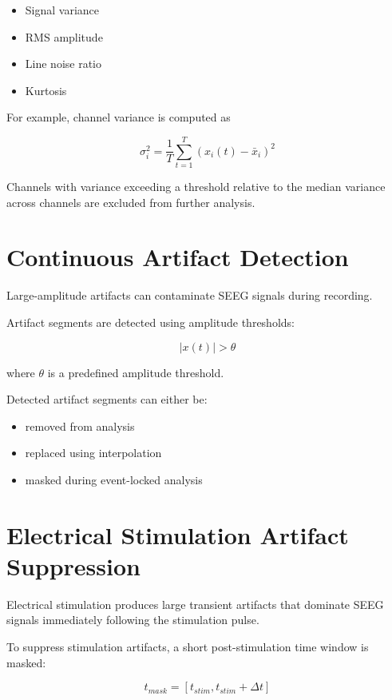 \documentclass[11pt]{report}
\begin{document}
\begin{itemize}
\item Signal variance
\item RMS amplitude
\item Line noise ratio
\item Kurtosis
\end{itemize}

For example, channel variance is computed as

\begin{equation}
\sigma_i^2 = \frac{1}{T} \sum_{t=1}^{T} (x_i(t) - \bar{x}_i)^2
\end{equation}

Channels with variance exceeding a threshold relative to the median
variance across channels are excluded from further analysis.

\section{Continuous Artifact Detection}

Large-amplitude artifacts can contaminate SEEG signals during recording.

Artifact segments are detected using amplitude thresholds:

\begin{equation}
|x(t)| > \theta
\end{equation}

where $\theta$ is a predefined amplitude threshold.

Detected artifact segments can either be:

\begin{itemize}
\item removed from analysis
\item replaced using interpolation
\item masked during event-locked analysis
\end{itemize}

\section{Electrical Stimulation Artifact Suppression}

Electrical stimulation produces large transient artifacts that
dominate SEEG signals immediately following the stimulation pulse.

To suppress stimulation artifacts, a short post-stimulation time
window is masked:

\begin{equation}
t_{mask} = [t_{stim}, t_{stim} + \Delta t]
\end{equation}
\end{document}
